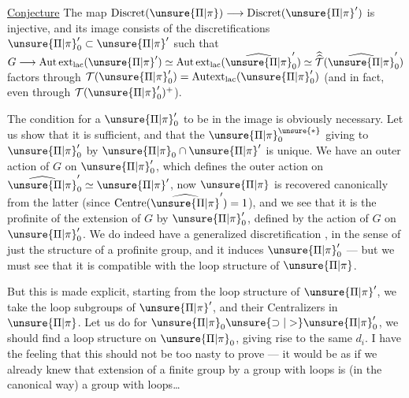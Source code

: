 \uline{Conjecture} The map \(\mathrm{Discret}(\unsure{\Pi|\pi})\longrightarrow\mathrm{Discret}(\unsure{\Pi|\pi}')\)
is injective, and its image consists of the
discretifications \(\unsure{\Pi|\pi}'_0\subset\unsure{\Pi|\pi}'\) such that
\(G\longrightarrow\mathrm{Aut\,ext}_{\mathrm{lac}}(\unsure{\Pi|\pi}')
\simeq\mathrm{Aut\,ext}_{\mathrm{lac}}(\widehat{\unsure{\Pi|\pi}}'_0)
\simeq\widehat{\widehat{\mathcal T}}(\widehat{\unsure{\Pi|\pi}}'_0)\)
factors through \(\mathcal T(\unsure{\Pi|\pi}'_0)=\mathrm{Autext}_{\mathrm{lac}}(\unsure{\Pi|\pi}'_0)\)
(and in fact, even through \(\mathcal T(\unsure{\Pi|\pi}'_0)^+\)).


The condition for a  \(\unsure{\Pi|\pi}'_0\) to be in
the image is obviously necessary. Let us show
that it is sufficient, and that the \(\unsure{\Pi|\pi}_0^{\unsure{*}}\) giving
 to \(\unsure{\Pi|\pi}'_0\) by \(\unsure{\Pi|\pi}_0\cap\unsure{\Pi|\pi}'\) is unique.
We have an outer action of \(G\) on \(\unsure{\Pi|\pi}'_0\),
which defines the outer action on \(\widehat{\unsure{\Pi|\pi}}'_0\simeq\unsure{\Pi|\pi}'\),
now \(\unsure{\Pi|\pi}\) is recovered canonically from
the latter (since \(\mathrm{Centre}(\widehat{\unsure{\Pi|\pi}}')=1\)), and we
see that it is the  profinite  of
the extension  of \(G\) by \(\unsure{\Pi|\pi}'_0\), defined by the
 action of \(G\) on \(\unsure{\Pi|\pi}'_0\). We do indeed have a
generalized discretification , in the sense of
just the structure of a  profinite group, and it
induces \(\unsure{\Pi|\pi}'_0\) --- but we must see that it
is compatible with the loop structure of \(\unsure{\Pi|\pi}\).

But this is made explicit, starting from the
loop structure of \(\unsure{\Pi|\pi}'\), we take the
loop subgroups  of \(\unsure{\Pi|\pi}'\), and their
Centralizers in \(\unsure{\Pi|\pi}\). Let us do  for
\(\unsure{\Pi|\pi}_0\unsure{\supset|>}\unsure{\Pi|\pi}'_0\), we should find a loop
structure on \(\unsure{\Pi|\pi}_0\), giving rise to the
same \(d_i\).
I have the feeling that this
should not be too nasty to prove --- it
would be as if we already knew that 
 extension of a finite group by a
group with loops is (in the canonical way)
a group with loops\ldots

